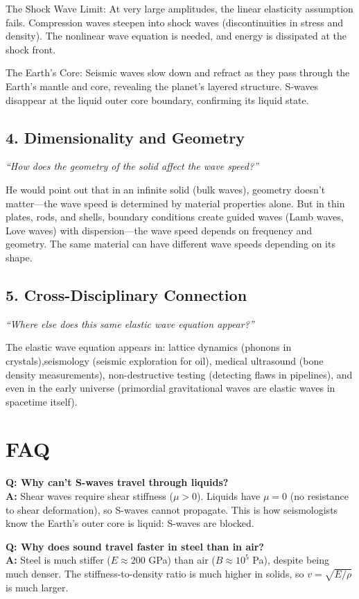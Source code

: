 \documentclass[11pt,openright]{book}
\begin{document}
The Shock Wave Limit: At very large amplitudes, the linear elasticity assumption fails. Compression waves steepen into shock waves (discontinuities in stress and density). The nonlinear wave equation is needed, and energy is dissipated at the shock front.

The Earth's Core: Seismic waves slow down and refract as they pass through the Earth's mantle and core, revealing the planet's layered structure. S-waves disappear at the liquid outer core boundary, confirming its liquid state.

\subsection*{4. Dimensionality and Geometry}
\textit{``How does the geometry of the solid affect the wave speed?''}

He would point out that in an infinite solid (bulk waves), geometry doesn't matter---the wave speed is determined by material properties alone. But in thin plates, rods, and shells, boundary conditions create guided waves (Lamb waves, Love waves) with dispersion---the wave speed depends on frequency and geometry. The same material can have different wave speeds depending on its shape.

\subsection*{5. Cross-Disciplinary Connection}
\textit{``Where else does this same elastic wave equation appear?''}

The elastic wave equation appears in: lattice dynamics (phonons in crystals),seismology (seismic exploration for oil), medical ultrasound (bone density measurements), non-destructive testing (detecting flaws in pipelines), and even in the early universe (primordial gravitational waves are elastic waves in spacetime itself).
\section*{FAQ}

\textbf{Q: Why can't S-waves travel through liquids?}\\
\textbf{A:} Shear waves require shear stiffness ($\mu > 0$). Liquids have $\mu = 0$ (no resistance to shear deformation), so S-waves cannot propagate. This is how seismologists know the Earth's outer core is liquid: S-waves are blocked.

\textbf{Q: Why does sound travel faster in steel than in air?}\\
\textbf{A:} Steel is much stiffer ($E \approx 200$ GPa) than air ($B \approx 10^5$ Pa), despite being much denser. The stiffness-to-density ratio is much higher in solids, so $v = \sqrt{E/\rho}$ is much larger.
\end{document}
